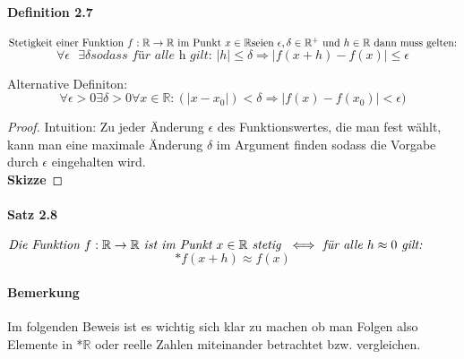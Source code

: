 \documentclass[a4paper]{article}
\begin{document}
\paragraph{Definition 2.7} $ \text{Stetigkeit einer Funktion } f:\mathbb{R} \to \mathbb{R} \text{ im Punkt } x \in \mathbb{R} \\
\text{seien }\epsilon, \delta  \in \mathbb{R}^+ \text{ und } h \in \mathbb{R} \text{ dann muss gelten:}$
$$ \forall \epsilon \text{ } \exists \delta \textit{sodass für alle h gilt: } |h| \leqslant \delta \Rightarrow |f(x + h) - f(x)| \leqslant \epsilon $$ 

Alternative Definiton:
$$ \forall \epsilon > 0 \exists \delta > 0 \forall x \in \mathbb{R}: (|x - x_0|) < \delta \Rightarrow |f(x) - f(x_0) | < \epsilon)$$
\begin{proof}
      Intuition: Zu jeder Änderung $ \epsilon $ des Funktionswertes, die man fest 
      wählt, kann man eine maximale Änderung $ \delta $ im Argument finden sodass
      die Vorgabe durch $ \epsilon $ eingehalten wird. \\  

      \smallskip
      \textbf{Skizze}
\end{proof}



\paragraph{Satz 2.8} $ \textit{Die Funktion } f:\mathbb{R} \to \mathbb{R} \textit{ ist im Punkt } x \in \mathbb{R} \textit{ stetig }
\iff \\ \textit{ für alle } h \approx 0 \textit{ gilt:} $
$$ \text{*}f(x + h) \approx f(x) $$ 

\paragraph{Bemerkung} Im folgenden Beweis ist es wichtig sich klar zu machen ob man Folgen also Elemente in *$\mathbb{R}$ oder reelle Zahlen 
miteinander betrachtet bzw. vergleichen.
\end{document}
